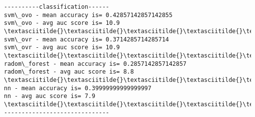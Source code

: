 \documentclass[11pt]{article}
\begin{document}
    \begin{Verbatim}[commandchars=\\\{\}]
----------classification------
svm\_ovo - mean accuracy is= 0.42857142857142855
svm\_ovo - avg auc score is= 10.9
\textasciitilde{}\textasciitilde{}\textasciitilde{}\textasciitilde{}\textasciitilde{}\textasciitilde{}\textasciitilde{}\textasciitilde{}\textasciitilde{}\textasciitilde{}\textasciitilde{}\textasciitilde{}\textasciitilde{}\textasciitilde{}\textasciitilde{}\textasciitilde{}\textasciitilde{}\textasciitilde{}\textasciitilde{}\textasciitilde{}\textasciitilde{}\textasciitilde{}\textasciitilde{}\textasciitilde{}\textasciitilde{}\textasciitilde{}\textasciitilde{}\textasciitilde{}\textasciitilde{}
svm\_ovr - mean accuracy is= 0.3714285714285714
svm\_ovr - avg auc score is= 10.9
\textasciitilde{}\textasciitilde{}\textasciitilde{}\textasciitilde{}\textasciitilde{}\textasciitilde{}\textasciitilde{}\textasciitilde{}\textasciitilde{}\textasciitilde{}\textasciitilde{}\textasciitilde{}\textasciitilde{}\textasciitilde{}\textasciitilde{}\textasciitilde{}\textasciitilde{}\textasciitilde{}\textasciitilde{}\textasciitilde{}\textasciitilde{}\textasciitilde{}\textasciitilde{}\textasciitilde{}\textasciitilde{}\textasciitilde{}\textasciitilde{}\textasciitilde{}\textasciitilde{}
radom\_forest - mean accuracy is= 0.2857142857142857
radom\_forest - avg auc score is= 8.8
\textasciitilde{}\textasciitilde{}\textasciitilde{}\textasciitilde{}\textasciitilde{}\textasciitilde{}\textasciitilde{}\textasciitilde{}\textasciitilde{}\textasciitilde{}\textasciitilde{}\textasciitilde{}\textasciitilde{}\textasciitilde{}\textasciitilde{}\textasciitilde{}\textasciitilde{}\textasciitilde{}\textasciitilde{}\textasciitilde{}\textasciitilde{}\textasciitilde{}\textasciitilde{}\textasciitilde{}\textasciitilde{}\textasciitilde{}\textasciitilde{}\textasciitilde{}\textasciitilde{}
nn - mean accuracy is= 0.39999999999999997
nn - avg auc score is= 7.9
\textasciitilde{}\textasciitilde{}\textasciitilde{}\textasciitilde{}\textasciitilde{}\textasciitilde{}\textasciitilde{}\textasciitilde{}\textasciitilde{}\textasciitilde{}\textasciitilde{}\textasciitilde{}\textasciitilde{}\textasciitilde{}\textasciitilde{}\textasciitilde{}\textasciitilde{}\textasciitilde{}\textasciitilde{}\textasciitilde{}\textasciitilde{}\textasciitilde{}\textasciitilde{}\textasciitilde{}\textasciitilde{}\textasciitilde{}\textasciitilde{}\textasciitilde{}\textasciitilde{}
------------------------------

    \end{Verbatim}
\end{document}
